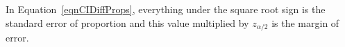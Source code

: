 In Equation~\eqref{eqnCIDiffProps}, 
everything under the square root sign is the standard error of proportion and
this value multiplied by $z_{\alpha / 2}$ is the margin of error.


%


